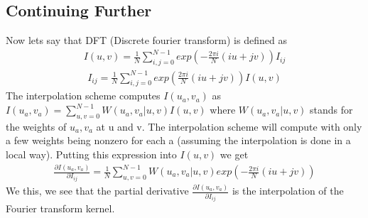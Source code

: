 \documentclass[letterpaper,10pt,english]{jupyterBook}
\begin{document}
\subsection{Continuing Further}
\label{\detokenize{dirty_gradient:continuing-further}}
\sphinxAtStartPar
Now lets say that DFT (Discrete fourier transform) is defined as
\begin{equation*}
\begin{split}I(u,v) = \frac{1}{N}\sum^{N-1}_{i,j = 0} exp(-\frac{2\pi i}{N}(iu+jv))I_{ij}\end{split}
\end{equation*}\begin{equation*}
\begin{split}I_{ij} = \frac{1}{N}\sum^{N-1}_{i,j = 0} exp(\frac{2\pi i}{N}(iu+jv))I(u,v)\end{split}
\end{equation*}
\sphinxAtStartPar
The interpolation scheme computes \(I(u_a,v_a)\) as \(I(u_a,v_a) = \sum_{u,v = 0}^{N-1} W(u_a,v_a|u,v)I(u,v)\) where \(W(u_a,v_a|u,v)\) stands for the weights of \(u_a,v_a\) at u and v. The interpolation scheme will compute with only a few weights being non\sphinxhyphen{}zero for each a (assuming the interpolation is done in a local way). Putting this expression into \(I(u,v)\) we get
\begin{equation*}
\begin{split}\frac{\partial I(u_a,v_a)}{\partial I_{ij}} = \frac{1}{N}\sum^{N-1}_{u,v = 0} W(u_a,v_a|u,v) exp(-\frac{2\pi i}{N}(iu+jv))\end{split}
\end{equation*}
\sphinxAtStartPar
We this, we see that the partial derivative \(\frac{\partial I(u_a,v_a)}{\partial I_{ij}}\) is the interpolation of the Fourier transform kernel.
\end{document}
